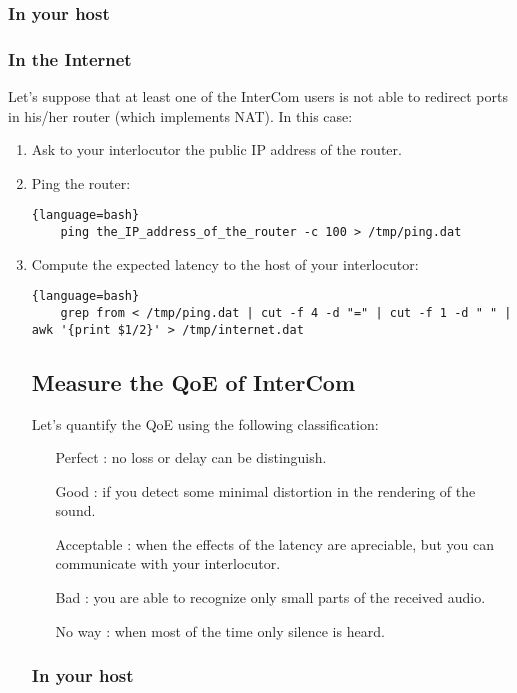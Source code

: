 \subsubsection{In your host}

\subsubsection{In the Internet}

Let's suppose that at least one of the InterCom users is not able to
redirect ports in his/her router (which implements NAT). In this case:

\begin{enumerate}
\item Ask to your interlocutor the public IP address of the router.
\item Ping the router:
  \begin{lstlisting}{language=bash}
    ping the_IP_address_of_the_router -c 100 > /tmp/ping.dat
  \end{lstlisting}
\item Compute the expected latency to the host of your interlocutor:
  \begin{lstlisting}{language=bash}
    grep from < /tmp/ping.dat | cut -f 4 -d "=" | cut -f 1 -d " " | awk '{print $1/2}' > /tmp/internet.dat
  \end{lstlisting}

\subsection{Measure the QoE of InterCom}

Let's quantify the QoE using the following classification:
\begin{itemize}
\item [Perfect]: no loss or delay can be distinguish.
\item [Good]: if you detect some minimal distortion in the rendering
  of the sound.
\item [Acceptable]: when the effects of the latency are apreciable, but
  you can communicate with your interlocutor.
\item [Bad]: you are able to recognize only small parts of the
  received audio.
\item [No way]: when most of the time only silence is heard.
\end{itemize}

\subsubsection{In your host}


\end{enumerate}
